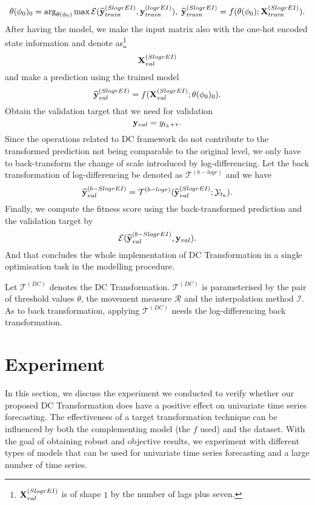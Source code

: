 \begin{equation*}
    \theta(\phi_0)_0 = \arg_{\theta(\phi_0)} \max \mathcal{E}(\widehat{\mathbf{y}}^{(SlogrEI)}_{train}, \mathbf{y}^{(logrEI)}_{train}), \; \widehat{\mathbf{y}}^{(SlogrEI)}_{train} = f(\theta(\phi_0); \mathbf{X}^{(SlogrEI)}_{train}).
\end{equation*}
After having the model, we make the input matrix also with the one-hot encoded state information and denote as\footnote{$\mathbf{X}^{(SlogrEI)}_{val}$ is of shape $1$ by the number of lags plus seven.}
\begin{equation*}
    \mathbf{X}^{(SlogrEI)}_{val}
\end{equation*}
and make a prediction using the trained model
\begin{equation*}
    \widehat{\mathbf{y}}^{(SlogrEI)}_{val} = f(\mathbf{X}^{(SlogrEI)}_{val} ; \theta(\phi_0)_0).
\end{equation*}
Obtain the validation target that we need for validation
\begin{equation*}
    \mathbf{y}_{val} = y_{t_k + \tau}.
\end{equation*}
Since the operations related to DC framework do not contribute to the transformed prediction not being comparable to the original level, we only have to back-transform the change of scale introduced by log-differencing. Let the back transformation of log-differencing be denoted as $\mathcal{T}^{(b-logr)}$ and we have
\begin{equation*}
    \widehat{\mathbf{y}}^{(b-SlogrEI)}_{val} = \mathcal{T}^{(b-logr)} (\widehat{\mathbf{y}}^{(SlogrEI)}_{val} ; \mathcal{Y}_{t_k}).
\end{equation*}
Finally, we compute the fitness score using the back-transformed prediction and the validation target by
\begin{equation*}
    \mathcal{E} (\widehat{\mathbf{y}}^{(b-SlogrEI)}_{val}, \mathbf{y}_{val}).
\end{equation*}
And that concludes the whole implementation of DC Transformation in a single optimisation task in the modelling procedure.

Let $\mathcal{T}^{(DC)}$ denotes the DC Transformation. $\mathcal{T}^{(DC)}$ is parameterised by the pair of threshold values $\theta$, the movement measure $\mathcal{R}$ and the interpolation method $\mathcal{I}$. As to back transformation, applying $\mathcal{T}^{(DC)}$ needs the log-differencing back transformation.

\section{Experiment}\label{sec: experiment}
In this section, we discuss the experiment we conducted to verify whether our proposed DC Transformation does have a positive effect on univariate time series forecasting. The effectiveness of a target transformation technique can be influenced by both the complementing model (the $f$ used) and the dataset. With the goal of obtaining robust and objective results, we experiment with different types of models that can be used for univariate time series forecasting and a large number of time series.

